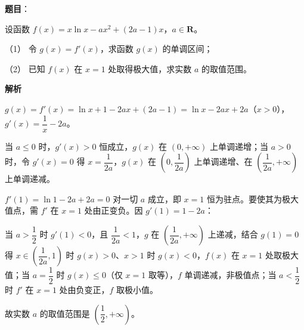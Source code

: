 \begin{answer}

\textbf{题目}：

设函数 \(f(x)=x\ln x-ax^2+(2a-1)x\)，\(a\in\mathbf{R}\)。

（1） 令 \(g(x)=f'(x)\)，求函数 \(g(x)\) 的单调区间；

（2） 已知 \(f(x)\) 在 \(x=1\) 处取得极大值，求实数 \(a\) 的取值范围。

\textbf{解析}


\(g(x)=f'(x)=\ln x+1-2ax+(2a-1)=\ln x-2ax+2a\)（\(x>0\)），\(g'(x)=\dfrac{1}{x}-2a\)。

当 \(a\leqslant 0\) 时，\(g'(x)>0\) 恒成立，\(g(x)\) 在 \((0,+\infty)\) 上单调递增；当 \(a>0\) 时，令 \(g'(x)=0\) 得 \(x=\dfrac{1}{2a}\)，\(g(x)\) 在 \(\left(0,\dfrac{1}{2a}\right)\) 上单调递增、在 \(\left(\dfrac{1}{2a},+\infty\right)\) 上单调递减。


\(f'(1)=\ln 1-2a+2a=0\) 对一切 \(a\) 成立，即 \(x=1\) 恒为驻点。要使其为极大值点，需 \(f'\) 在 \(x=1\) 处由正变负。因 \(g'(1)=1-2a\)：

当 \(a>\dfrac{1}{2}\) 时 \(g'(1)<0\)，且 \(\dfrac{1}{2a}<1\)，\(g\) 在 \(\left(\dfrac{1}{2a},+\infty\right)\) 上递减，结合 \(g(1)=0\) 得 \(x\in\left(\dfrac{1}{2a},1\right)\) 时 \(g(x)>0\)、\(x>1\) 时 \(g(x)<0\)，\(f(x)\) 在 \(x=1\) 处取极大值；当 \(a=\dfrac{1}{2}\) 时 \(g(x)\leqslant 0\)（仅 \(x=1\) 取等），\(f\) 单调递减，非极值点；当 \(a<\dfrac{1}{2}\) 时 \(f'\) 在 \(x=1\) 处由负变正，\(f\) 取极小值。

故实数 \(a\) 的取值范围是 \(\left(\dfrac{1}{2},+\infty\right)\)。



\end{answer}
